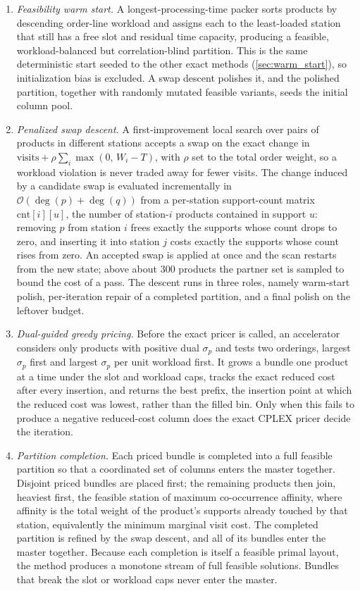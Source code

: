 \documentclass[preprint,review,11pt,authoryear]{elsarticle}
\begin{document}
\begin{enumerate}
    \item \emph{Feasibility warm start.} A longest-processing-time packer sorts products by descending order-line workload and assigns each to the least-loaded station that still has a free slot and residual time capacity, producing a feasible, workload-balanced but correlation-blind partition. This is the same deterministic start seeded to the other exact methods (\cref{sec:warm_start}), so initialization bias is excluded. A swap descent polishes it, and the polished partition, together with randomly mutated feasible variants, seeds the initial column pool.

    \item \emph{Penalized swap descent.} A first-improvement local search over pairs of products in different stations accepts a swap on the exact change in $\text{visits} + \rho\sum_i \max(0,\, W_i - T)$, with $\rho$ set to the total order weight, so a workload violation is never traded away for fewer visits. The change induced by a candidate swap is evaluated incrementally in $\mathcal{O}(\deg(p)+\deg(q))$ from a per-station support-count matrix $\mathrm{cnt}[i][u]$, the number of station-$i$ products contained in support $u$: removing $p$ from station $i$ frees exactly the supports whose count drops to zero, and inserting it into station $j$ costs exactly the supports whose count rises from zero. An accepted swap is applied at once and the scan restarts from the new state; above about $300$ products the partner set is sampled to bound the cost of a pass. The descent runs in three roles, namely warm-start polish, per-iteration repair of a completed partition, and a final polish on the leftover budget.

    \item \emph{Dual-guided greedy pricing.} Before the exact pricer is called, an accelerator considers only products with positive dual $\sigma_p$ and tests two orderings, largest $\sigma_p$ first and largest $\sigma_p$ per unit workload first. It grows a bundle one product at a time under the slot and workload caps, tracks the exact reduced cost after every insertion, and returns the best prefix, the insertion point at which the reduced cost was lowest, rather than the filled bin. Only when this fails to produce a negative reduced-cost column does the exact CPLEX pricer decide the iteration.

    \item \emph{Partition completion.} Each priced bundle is completed into a full feasible partition so that a coordinated set of columns enters the master together. Disjoint priced bundles are placed first; the remaining products then join, heaviest first, the feasible station of maximum co-occurrence affinity, where affinity is the total weight of the product's supports already touched by that station, equivalently the minimum marginal visit cost. The completed partition is refined by the swap descent, and all of its bundles enter the master together. Because each completion is itself a feasible primal layout, the method produces a monotone stream of full feasible solutions. Bundles that break the slot or workload caps never enter the master.


\end{enumerate}
\end{document}
